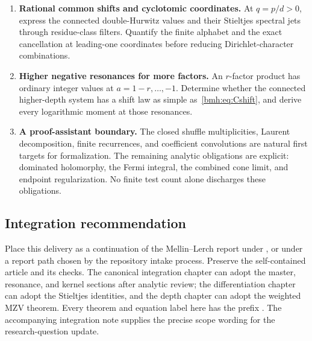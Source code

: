 \begin{enumerate}[label=\textbf{Q\arabic*.},leftmargin=2.8em,itemsep=7pt]
specializes to the finite binomial formula. This is a precise route toward
products containing $\Li_s^{[r]}$ without assuming finite ordinary-MPL
closure at noninteger order.
\item \textbf{Rational common shifts and cyclotomic coordinates.}
At $q=p/d>0$, express the connected double-Hurwitz values and their
Stieltjes spectral jets through residue-class filters. Quantify the finite
alphabet and the exact cancellation at leading-one coordinates before
reducing Dirichlet-character combinations.
\item \textbf{Higher negative resonances for more factors.}
An $r$-factor product has ordinary integer values at
$a=1-r,\ldots,-1$. Determine whether the connected higher-depth system
has a shift law as simple as~\eqref{bmh:eq:Cshift}, and derive every
logarithmic moment at those resonances.
\item \textbf{A proof-assistant boundary.}
The closed shuffle multiplicities, Laurent decomposition, finite
recurrences, and coefficient convolutions are natural first targets for
formalization. The remaining analytic obligations are explicit: dominated
holomorphy, the Fermi integral, the combined cone limit, and endpoint
regularization. No finite test count alone discharges these obligations.
\end{enumerate}

\subsection{Integration recommendation}
Place this delivery as a continuation of the Mellin--Lerch report under
, or under a report path chosen
by the repository intake process. Preserve the self-contained article and
its checks. The canonical integration chapter can adopt the master,
resonance, and kernel sections after analytic review; the differentiation
chapter can adopt the Stieltjes identities, and the depth chapter can
adopt the weighted MZV theorem. Every theorem and equation label here has
the prefix . The accompanying integration note supplies the
precise scope wording for the research-question update.
